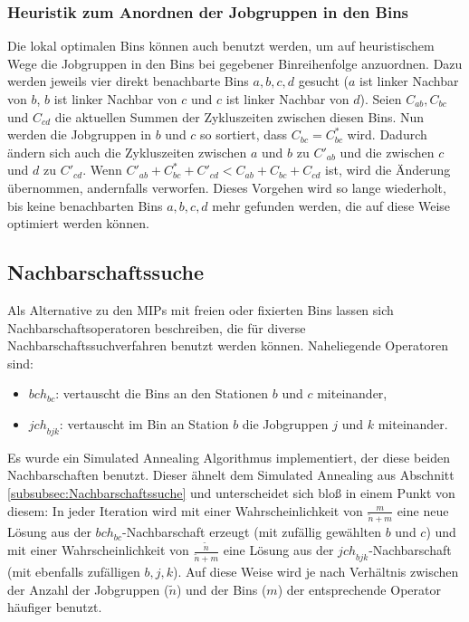 \documentclass{scrreprt}
\begin{document}
\subsubsection{Heuristik zum Anordnen der Jobgruppen in den Bins}
\label{subsubsec:HzAdJidB}
Die lokal optimalen Bins können auch benutzt werden, um auf heuristischem Wege die Jobgruppen in den Bins bei gegebener Binreihenfolge anzuordnen.
Dazu werden jeweils vier direkt benachbarte Bins $a,b,c,d$ gesucht ($a$ ist linker Nachbar von $b$, $b$ ist linker Nachbar von $c$ und $c$ ist linker Nachbar von $d$).
Seien $C_{ab},C_{bc}$ und $C_{cd}$ die aktuellen Summen der Zykluszeiten zwischen diesen Bins.
Nun werden die Jobgruppen in $b$ und $c$ so sortiert, dass $C_{bc}=C_{bc}^*$ wird.
Dadurch ändern sich auch die Zykluszeiten zwischen $a$ und $b$ zu $C'_{ab}$ und die zwischen $c$ und $d$ zu $C'_{cd}$.
Wenn $C'_{ab}+C_{bc}^*+C'_{cd} < C_{ab}+C_{bc}+C_{cd}$ ist, wird die Änderung übernommen, andernfalls verworfen.
Dieses Vorgehen wird so lange wiederholt, bis keine benachbarten Bins $a,b,c,d$ mehr gefunden werden, die auf diese Weise optimiert werden können.


\subsection{Nachbarschaftssuche}
\label{subsec:Nachbarschaftssuche}
Als Alternative zu den MIPs mit freien oder fixierten Bins lassen sich Nachbarschaftsoperatoren beschreiben, 
die für diverse Nachbarschaftssuchverfahren benutzt werden können.
Naheliegende Operatoren sind:
\begin{itemize}
    \item $\mathit{bch}_{bc}$: vertauscht die Bins an den Stationen $b$ und $c$ miteinander,
    \item $\mathit{jch}_{bjk}$: vertauscht im Bin an Station $b$ die Jobgruppen $j$ und $k$ miteinander.
\end{itemize}
Es wurde ein Simulated Annealing Algorithmus implementiert, der diese beiden Nachbarschaften benutzt.
Dieser ähnelt dem Simulated Annealing aus Abschnitt \ref{subsubsec:Nachbarschaftssuche} und unterscheidet sich bloß in einem Punkt von diesem:
In jeder Iteration wird mit einer Wahrscheinlichkeit von $\frac{m}{\tilde{n}+m}$ eine neue Lösung aus der $\mathit{bch}_{bc}$-Nachbarschaft erzeugt 
(mit zufällig gewählten $b$ und $c$) und mit einer Wahrscheinlichkeit von $\frac{\tilde{n}}{\tilde{n}+m}$ eine Lösung aus der $\mathit{jch}_{bjk}$-Nachbarschaft
(mit ebenfalls zufälligen $b,j,k$).
Auf diese Weise wird je nach Verhältnis zwischen der Anzahl der Jobgruppen ($\tilde{n}$) und der Bins ($m$) der entsprechende Operator häufiger benutzt.
\end{document}
